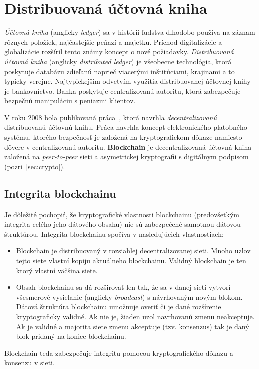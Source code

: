 \section{Distribuovaná účtovná kniha}
\textit{Účtovná kniha} (anglicky \textit{ledger}) sa v histórii ľudstva dlhodobo používa na záznam rôznych položiek, najčastejšie peňazí a majetku. Príchod digitalizácie a globalizácie rozšíril tento známy koncept o nové požiadavky.
\textit{Distribuovaná účtovná kniha} (anglicky \textit{distributed ledger}) je všeobecne technológia, ktorá poskytuje databázu zdieľanú naprieč viacerými inštitúciami, krajinami a to typicky verejne. Najtypickejším odvetvím využitia distribuovanej účtovnej knihy je bankovníctvo. Banka poskytuje centralizovanú autoritu, ktorá zabezpečuje bezpečnú manipuláciu s peniazmi klientov.~\cite{dltUkReport}

V roku 2008 bola publikovaná práca~\cite{satoshiBitcoin}, ktorá navrhla \textit{decentralizovanú} distribuovanú účtovnú knihu. Práca navrhla koncept elektronického platobného systému, ktorého bezpečnosť je založená na kryptografickom dôkaze namiesto dôvere v centralizovanú autoritu. \textbf{Blockchain} je decentralizovaná účtovná kniha založená na \textit{peer-to-peer} sieti a asymetrickej kryptografii s digitálnym podpisom (pozri~\ref{sec:crypto}).

\subsection{Integrita blockchainu}
Je dôležité pochopiť, že kryptografické vlastnosti blockchainu (predovšetkým integrita  celého jeho dátového obsahu) nie sú zabezpečené samotnou dátovou štruktúrou. Integrita blockchainu spočíva v nasledujúcich vlastnostiach:
\begin{itemize}
	\item Blockchain je distribuovaný v rozsiahlej decentralizovanej sieti. Mnoho uzlov tejto siete vlastní kopiju aktuálneho blockchainu. Validný blockchain je ten ktorý vlastní väčšina siete.
	\item Obsah blockchainu sa dá rozširovať len tak, že sa v danej sieti vytvorí všesmerové vysielanie (anglicky \textit{broadcast}) s návrhovaným novým blokom. Dátová štruktúra blockchainu umožnuje overiť či je dané rozšírenie kryptograficky validné. Ak nie je, žiaden uzol navrhovanú zmenu neakceptuje. Ak je validné a majorita siete zmenu akceptuje (tzv. konsenzus) tak je daný blok pridaný na koniec blockchainu.
\end{itemize}
Blockchain teda zabezpečuje integritu pomocou kryptografického dôkazu a konsenzu v sieti.~\cite{horizenAcademy}

